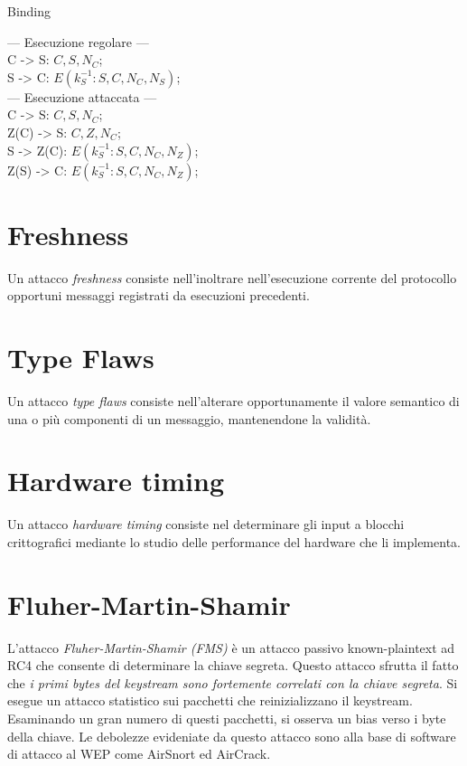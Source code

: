 \bigskip
\begin{algorithm}[H]
  \caption{Binding}
  \label{alg:attack-binding}
  \SetAlgoNoLine
  --- Esecuzione regolare --- \\
  C -> S: $C,S,N_{C}$;\\
  S -> C: $E(k_{S}^{-1}:S,C,N_{C},N_{S})$;\\
  --- Esecuzione attaccata --- \\
  C -> S: $C,S,N_{C}$;\\
  Z(C) -> S: $C,Z,N_{C}$;\\
  S -> Z(C): $E(k_{S}^{-1}:S,C,N_{C},N_{Z})$;\\
  Z(S) -> C: $E(k_{S}^{-1}:S,C,N_{C},N_{Z})$;\\
\end{algorithm}

\section{Freshness}
Un attacco \textit{freshness} consiste nell'inoltrare nell'esecuzione corrente del protocollo opportuni messaggi registrati da esecuzioni precedenti.

\section{Type Flaws}
Un attacco \textit{type flaws} consiste nell'alterare opportunamente  il valore semantico di una o più componenti di un messaggio, mantenendone la validità.

\section{Hardware timing}
Un attacco \textit{hardware timing} consiste nel determinare gli input a blocchi crittografici mediante lo studio delle performance del hardware che li implementa.

\section{Fluher-Martin-Shamir}
L'attacco \textit{Fluher-Martin-Shamir (FMS)} è un attacco passivo known-plaintext ad RC4 che consente di determinare la chiave segreta.
Questo attacco sfrutta il fatto che \textit{i primi bytes del keystream sono fortemente correlati con la chiave segreta}. Si esegue un attacco statistico sui pacchetti che reinizializzano il keystream. Esaminando un gran numero di questi pacchetti, si osserva un bias verso i byte della chiave.
Le debolezze evideniate da questo attacco sono alla base di software di attacco al WEP come AirSnort ed AirCrack.


